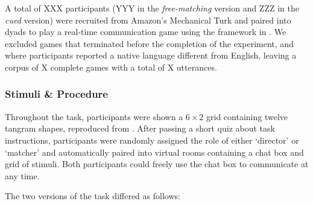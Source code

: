 \documentclass[alpha-refs]{wiley-article}
\begin{document}
A total of XXX participants (YYY in the \emph{free-matching} version and ZZZ in the \emph{cued} version) were recruited from Amazon's Mechanical Turk and paired into dyads to play a real-time communication game using the framework in \cite{Hawkins15_RealTimeWebExperiments}. 
We excluded games that terminated before the completion of the experiment, and where participants reported a native language different from English, leaving a corpus of X complete games with a total of X utterances.

\subsubsection{Stimuli \& Procedure}\label{stimuli}

Throughout the task, participants were shown a \(6 \times 2\) grid containing twelve tangram shapes, reproduced from \cite{clarkReferringCollaborativeProcess1986}.  
After passing a short quiz about task instructions, participants were randomly assigned the role of either `director' or `matcher' and automatically paired into virtual rooms containing a chat box and grid of stimuli. 
Both participants could freely use the chat box to communicate at any time. 

The two versions of the task differed as follows:
\end{document}
